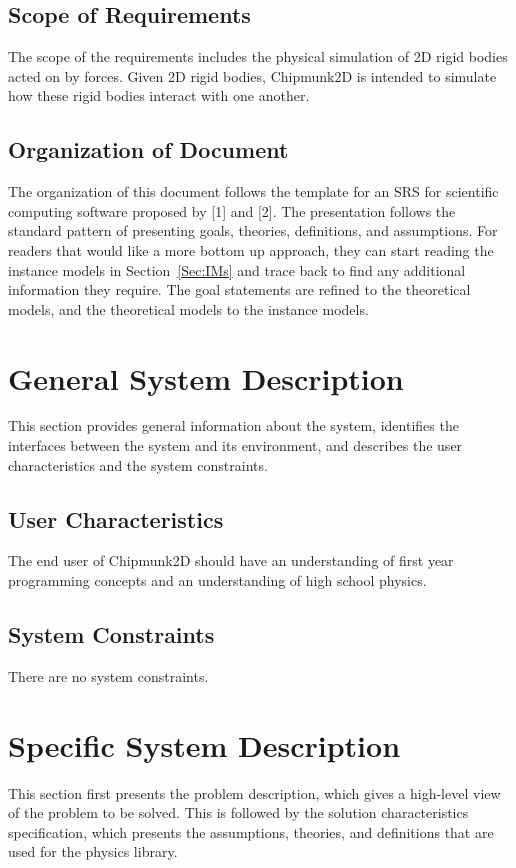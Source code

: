 \documentclass[12pt]{article}
\begin{document}
\subsection{Scope of Requirements}
\label{Sec:SoRs}
The scope of the requirements includes the physical simulation of 2D rigid bodies acted on by forces. Given 2D rigid bodies, Chipmunk2D is intended to simulate how these rigid bodies interact with one another.
\subsection{Organization of Document}
\label{Sec:OoD}
The organization of this document follows the template for an SRS for scientific computing software proposed by [1] and [2]. The presentation follows the standard pattern of presenting goals, theories, definitions, and assumptions. For readers that would like a more bottom up approach, they can start reading the instance models in Section~\ref{Sec:IMs} and trace back to find any additional information they require.
The goal statements are refined to the theoretical models, and the theoretical models to the instance models.
\section{General System Description}
\label{Sec:GSD}
This section provides general information about the system, identifies the interfaces between the system and its environment, and describes the user characteristics and the system constraints.
\subsection{User Characteristics}
\label{Sec:UC}
The end user of Chipmunk2D should have an understanding of first year programming concepts and an understanding of high school physics.
\subsection{System Constraints}
\label{Sec:SC}
There are no system constraints.
\section{Specific System Description}
\label{Sec:SSD}
This section first presents the problem description, which gives a high-level view of the problem to be solved. This is followed by the solution characteristics specification, which presents the assumptions, theories, and definitions that are used for the physics library.
\end{document}
